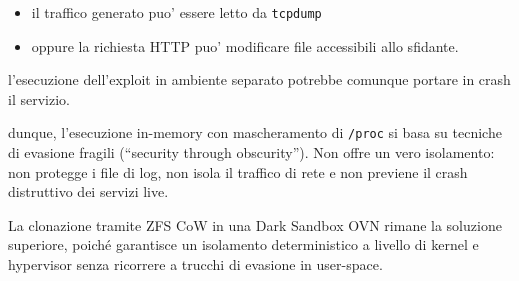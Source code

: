 \begin{itemize}
\tightlist
\item
  il traffico generato puo' essere letto da
  \passthrough{\lstinline!tcpdump!}
\item
  oppure la richiesta HTTP puo' modificare file accessibili allo
  sfidante.
\end{itemize}

l'esecuzione dell'exploit in ambiente separato potrebbe comunque portare
in crash il servizio.

dunque, l'esecuzione in-memory con mascheramento di
\passthrough{\lstinline!/proc!} si basa su tecniche di evasione fragili
(``security through obscurity''). Non offre un vero isolamento: non
protegge i file di log, non isola il traffico di rete e non previene il
crash distruttivo dei servizi live.

La clonazione tramite ZFS CoW in una Dark Sandbox OVN rimane la
soluzione superiore, poiché garantisce un isolamento deterministico a
livello di kernel e hypervisor senza ricorrere a trucchi di evasione in
user-space.
